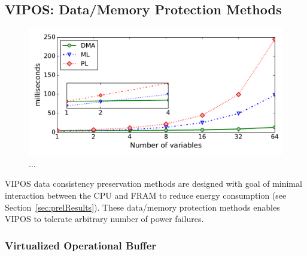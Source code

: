 
\subsection{VIPOS: Data/Memory Protection Methods}

\begin{figure}[t]
	\centering
	\includegraphics[width=0.8\columnwidth]{figures/iposCommitSize}
	\caption{...}
	\label{fig:virtOperationalBuf}
\end{figure}


VIPOS data consistency preservation methods are designed with goal of minimal interaction between the CPU and FRAM to reduce energy consumption (see Section~\ref{sec:prelResults}). These data/memory protection methods enables VIPOS to tolerate arbitrary number of power failures. 

	\subsubsection{Virtualized Operational Buffer}

